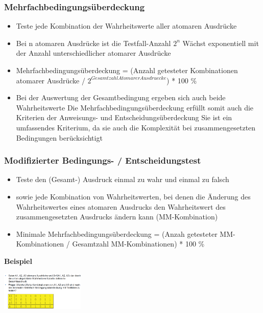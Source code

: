 \documentclass{report}
\newenvironment{Figure}
	{\par\medskip\noindent\minipage{\linewidth}}
	{\endminipage\par\medskip}
\theoremstyle{definition}
\theoremstyle{example}
\begin{document}
\subsubsection{Mehrfachbedingungsüberdeckung}
\begin{itemize}
   \item Teste jede Kombination der Wahrheitswerte aller atomaren Ausdrücke
   \item Bei n atomaren Ausdrücke ist die Testfall-Anzahl $2^n$
   \subitem Wächst exponentiell mit der Anzahl unterschiedlicher atomarer Ausdrücke
   \item Mehrfachbedingungsüberdeckung = (Anzahl getesteter Kombinationen atomarer Ausdrücke / $2^{GesamtzahlAtomarerAusdruecke}$) * 100 \% 
   \item Bei der Auswertung der Gesamtbedingung ergeben sich auch beide Wahrheitswerte
   \subitem Die Mehrfachbedingungsüberdeckung erfüllt somit auch die Kriterien der Anweisungs- und Entscheidungsüberdeckung
   \subitem Sie ist ein umfassendes Kriterium, da sie auch die Komplexität bei zusammengesetzten Bedingungen berücksichtigt 
\end{itemize}

\subsubsection{Modifizierter Bedingungs- / Entscheidungstest}
\begin{itemize}
   \item Teste den (Gesamt-) Ausdruck einmal zu wahr und einmal zu falsch
   \item sowie jede Kombination von Wahrheitswerten, bei denen die Änderung des Wahrheitswertes eines atomaren Ausdrucks den Wahrheitswert des zusammengesetzten Ausdrucks ändern kann (MM-Kombination)
   \item Minimale Mehrfachbedingungsüberdeckung = (Anzah getesteter MM-Kombinationen / Gesamtzahl MM-Kombinationen) * 100 \%
\end{itemize}

\textbf{Beispiel}
\begin{Figure}
   \centering
    \includegraphics[width=150px]{img/MMBeispielI.png}
        \label{fig:Beispiel MM Kombination Frage}
    \end{Figure}
\end{document}
